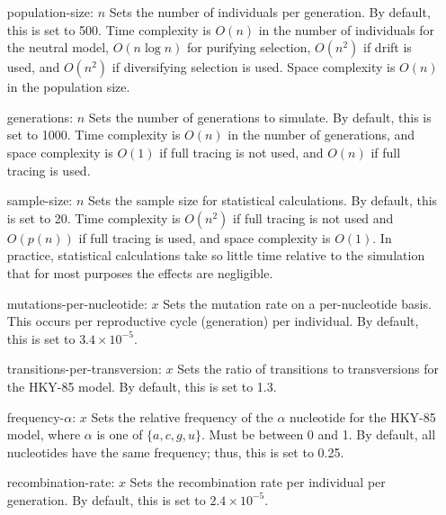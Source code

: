 \documentclass{article}
\begin{document}
        \begin{enumerate}
          \item[population-size: $n$]
          Sets the number of individuals per generation. By default, this is set
          to 500. Time complexity is $O(n)$ in the number of individuals for the
          neutral model, $O(n \log n)$ for purifying selection, $O(n^2)$ if
          drift is used, and $O(n^2)$ if diversifying selection is used. Space
          complexity is $O(n)$ in the population size.

          \item[generations: $n$]
          Sets the number of generations to simulate. By default, this is set to
          1000. Time complexity is $O(n)$ in the number of generations, and
          space complexity is $O(1)$ if full tracing is not used, and $O(n)$ if
          full tracing is used.

          \item[sample-size: $n$]
          Sets the sample size for statistical calculations. By default, this is
          set to 20. Time complexity is $O(n^2)$ if full tracing is not used and
          $O(p(n))$ if full tracing is used, and space complexity is $O(1)$. In
          practice, statistical calculations take so little time relative to the
          simulation that for most purposes the effects are negligible.

          \item[mutations-per-nucleotide: $x$]
          Sets the mutation rate on a per-nucleotide basis. This occurs per
          reproductive cycle (generation) per individual. By default, this is
          set to $3.4 \times 10^{-5}$.

          \item[transitions-per-transversion: $x$]
          Sets the ratio of transitions to transversions for the HKY-85 model.
          By default, this is set to 1.3.

          \item[frequency-$\alpha$: $x$]
          Sets the relative frequency of the $\alpha$ nucleotide for the HKY-85
          model, where $\alpha$ is one of $\{a, c, g, u\}$. Must be between 0
          and 1. By default, all nucleotides have the same frequency; thus,
          this is set to 0.25.

          \item[recombination-rate: $x$]
          Sets the recombination rate per individual per generation. By default,
          this is set to $2.4 \times 10^{-5}$.


\end{enumerate}
\end{document}
